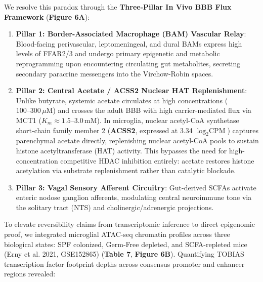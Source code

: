 \documentclass[10pt,a4paper]{article}
\begin{document}
We resolve this paradox through the \textbf{Three-Pillar In Vivo BBB Flux Framework} (\textbf{Figure 6A}):
\begin{enumerate}
\item \textbf{Pillar 1: Border-Associated Macrophage (BAM) Vascular Relay}: Blood-facing perivascular, leptomeningeal, and dural BAMs express high levels of FFAR2/3 and undergo primary epigenetic and metabolic reprogramming upon encountering circulating gut metabolites, secreting secondary paracrine messengers into the Virchow-Robin spaces.
\item \textbf{Pillar 2: Central Acetate / ACSS2 Nuclear HAT Replenishment}: Unlike butyrate, systemic acetate circulates at high concentrations ($100\text{--}300\,\mu\text{M}$) and crosses the adult BBB with high carrier-mediated flux via MCT1 ($K_m \approx 1.5\text{--}3.0\,\text{mM}$). In microglia, nuclear acetyl-CoA synthetase short-chain family member 2 (\textbf{ACSS2}, expressed at 3.34 $\log_2\text{CPM}$) captures parenchymal acetate directly, replenishing nuclear acetyl-CoA pools to sustain histone acetyltransferase (HAT) activity\cite{erny2021_8}. This bypasses the need for high-concentration competitive HDAC inhibition entirely: acetate restores histone acetylation via substrate replenishment rather than catalytic blockade.
\item \textbf{Pillar 3: Vagal Sensory Afferent Circuitry}: Gut-derived SCFAs activate enteric nodose ganglion afferents, modulating central neuroimmune tone via the solitary tract (NTS) and cholinergic/adrenergic projections\cite{spichak2021_30}.
\end{enumerate}
To elevate reversibility claims from transcriptomic inference to direct epigenomic proof, we integrated microglial ATAC-seq chromatin profiles across three biological states: SPF colonized, Germ-Free depleted, and SCFA-repleted mice (Erny et al. 2021, GSE152865)\cite{erny2021_41} (\textbf{Table 7}, \textbf{Figure 6B}). Quantifying TOBIAS transcription factor footprint depths across consensus promoter and enhancer regions revealed:
\end{document}
